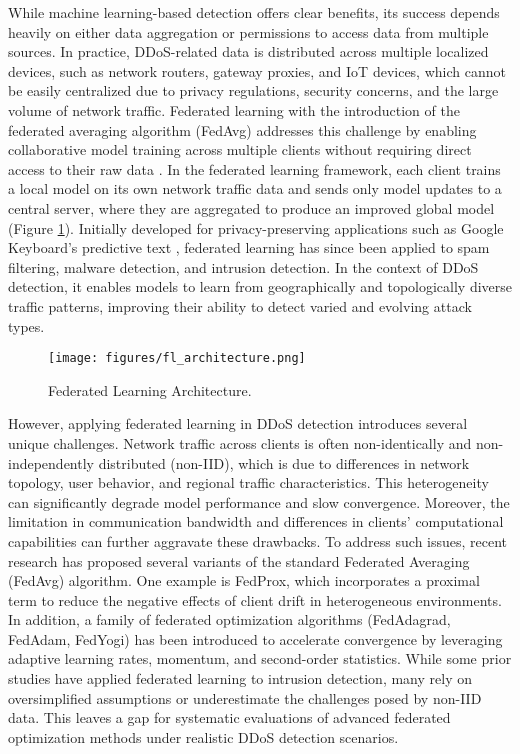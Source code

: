 While machine learning-based detection offers clear benefits, its success depends heavily on either data aggregation or permissions to access data from multiple sources. In practice, DDoS-related data is distributed across multiple localized devices, such as network routers, gateway proxies, and IoT devices, which cannot be easily centralized due to privacy regulations, security concerns, and the large volume of network traffic. Federated learning with the introduction of the federated averaging algorithm (FedAvg) addresses this challenge by enabling collaborative model training across multiple clients without requiring direct access to their raw data \citep{mcmahan2023communication}. In the federated learning framework, each client trains a local model on its own network traffic data and sends only model updates to a central server, where they are aggregated to produce an improved global model (Figure \ref{fig:fl_architecture}). Initially developed for privacy-preserving applications such as Google Keyboard’s predictive text \citep{47586}, federated learning has since been applied to spam filtering, malware detection, and intrusion detection. In the context of DDoS detection, it enables models to learn from geographically and topologically diverse traffic patterns, improving their ability to detect varied and evolving attack types.

\begin{figure}[h]
    \centering
    \texttt{[image: figures/fl\_architecture.png]}
    \caption{Federated Learning Architecture.}
    \label{fig:fl_architecture}
\end{figure}

However, applying federated learning in DDoS detection introduces several unique challenges. Network traffic across clients is often non-identically and non-independently distributed (non-IID), which is due to differences in network topology, user behavior, and regional traffic characteristics. This heterogeneity can significantly degrade model performance and slow convergence. Moreover, the limitation in communication bandwidth and differences in clients' computational capabilities can further aggravate these drawbacks. To address such issues, recent research has proposed several variants of the standard Federated Averaging (FedAvg) algorithm. One example is FedProx, which incorporates a proximal term to reduce the negative effects of client drift in heterogeneous environments. In addition, a family of federated optimization algorithms (FedAdagrad, FedAdam, FedYogi) has been introduced to accelerate convergence by leveraging adaptive learning rates, momentum, and second-order statistics. While some prior studies have applied federated learning to intrusion detection, many rely on oversimplified assumptions or underestimate the challenges posed by non-IID data. This leaves a gap for systematic evaluations of advanced federated optimization methods under realistic DDoS detection scenarios.

